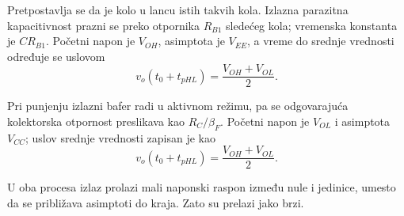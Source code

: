 Pretpostavlja se da je kolo u lancu istih takvih kola. Izlazna parazitna kapacitivnost prazni se preko otpornika $R_{B1}$ sledećeg kola; vremenska konstanta je $CR_{B1}$. Početni napon je $V_{OH}$, asimptota je $V_{EE}$, a vreme do srednje vrednosti određuje se uslovom
\[v_o(t_0+t_{pHL})=\frac{V_{OH}+V_{OL}}2.\]

Pri punjenju izlazni bafer radi u aktivnom režimu, pa se odgovarajuća kolektorska otpornost preslikava kao $R_C/\beta_F$. Početni napon je $V_{OL}$ i asimptota $V_{CC}$; uslov srednje vrednosti zapisan je kao
\[v_o(t_0+t_{pHL})=\frac{V_{OH}+V_{OL}}2.\]

U oba procesa izlaz prolazi mali naponski raspon između nule i jedinice, umesto da se približava asimptoti do kraja. Zato su prelazi jako brzi.
